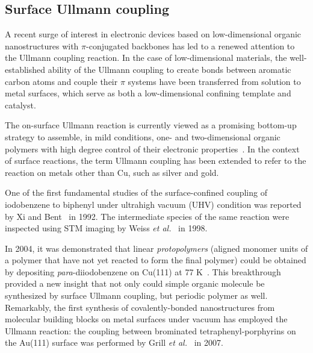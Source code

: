 \documentclass[%
 reprint,
 amsmath,amssymb,
 aps,
prb,
]{revtex4-2}
\begin{document}

\subsection{Surface Ullmann coupling}

A recent surge of interest in electronic devices based on low-dimensional organic nanostructures with $\pi$-conjugated backbones has led to a renewed attention to the Ullmann coupling reaction. 
In the case of low-dimensional materials, the well-established ability of the Ullmann coupling to create bonds between aromatic carbon atoms and couple their $\pi$ systems have been transferred from solution to metal surfaces, which serve as both a low-dimensional confining template and catalyst.

The on-surface Ullmann reaction is currently viewed as a promising bottom-up strategy to assemble, in mild conditions, one- and two-dimensional organic polymers with high degree control of their electronic properties~\cite{ullmann_33}. 
In the context of surface reactions, the term Ullmann coupling has been extended to refer to the reaction on metals other than Cu, such as silver and gold. 

One of the first fundamental studies of the surface-confined coupling of iodobenzene to biphenyl under ultrahigh vacuum (UHV) condition was reported by Xi and Bent~\cite{sur_sci01} in 1992.
%
The intermediate species of the same reaction were inspected using STM imaging by Weiss \textit{et al.}~\cite{langm01} in 1998.
%

In 2004, it was demonstrated that linear \emph{protopolymers} (aligned monomer units of a polymer that have not yet reacted to form the final polymer) could be obtained by depositing \textit{para}-diiodobenzene on Cu(111) at 77 K~\cite{jacs01}. This breakthrough provided a new insight that not only could simple organic molecule be synthesized by surface Ullmann coupling, but periodic polymer as well.
Remarkably, the first synthesis of covalently-bonded nanostructures from molecular building blocks on metal surfaces under vacuum has employed the Ullmann reaction: the coupling between brominated tetraphenyl-porphyrins on the Au(111) surface was performed by Grill \textit{et al.}~\cite{Naturenano2007} in 2007.
\end{document}
